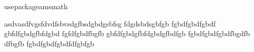 usepackage{amsmath}


asdvasdfvgsfdvdfsbvsdgfbsdgbdgsbfsg
fdgdsbdsgbfgb
fgbdfgbdfgbdf
gbfdfgbdgfbfdgbd
fgfdfgbdfbgfb
gbfdfgbdgfbfdgbdgfbdfgb
fgbdfgbdfgbdfbgdfb
dfbgfb
fgbdfgbdfgbdfdfgbfgb
